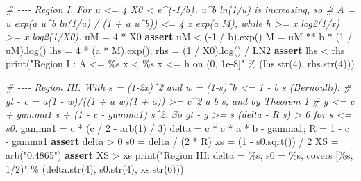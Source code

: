 \documentclass[
  11pt,
]{article}
\newenvironment{Shaded}{}{}
\newcommand{\BuiltInTok}[1]{\textcolor[rgb]{0.00,0.50,0.00}{#1}}
\newcommand{\CommentTok}[1]{\textcolor[rgb]{0.38,0.63,0.69}{\textit{#1}}}
\newcommand{\ControlFlowTok}[1]{\textcolor[rgb]{0.00,0.44,0.13}{\textbf{#1}}}
\newcommand{\DecValTok}[1]{\textcolor[rgb]{0.25,0.63,0.44}{#1}}
\newcommand{\NormalTok}[1]{#1}
\newcommand{\OperatorTok}[1]{\textcolor[rgb]{0.40,0.40,0.40}{#1}}
\newcommand{\SpecialCharTok}[1]{\textcolor[rgb]{0.25,0.44,0.63}{#1}}
\newcommand{\StringTok}[1]{\textcolor[rgb]{0.25,0.44,0.63}{#1}}
\begin{document}
\begin{Shaded}
\begin{Highlighting}[]
\CommentTok{\# {-}{-}{-}{-} Region I. For u \textless{}= 4 X0 \textless{} e\^{}\{{-}1/b\}, u\^{}b ln(1/u) is increasing, so}
\CommentTok{\#      A = u exp(a u\^{}b ln(1/u) / (1 + a u\^{}b)) \textless{}= 4 x exp(a M), while h \textgreater{}= x log2(1/x) \textgreater{}= x log2(1/X0).}
\NormalTok{uM }\OperatorTok{=} \DecValTok{4} \OperatorTok{*}\NormalTok{ X0}
\ControlFlowTok{assert}\NormalTok{ uM }\OperatorTok{\textless{}}\NormalTok{ (}\OperatorTok{{-}}\DecValTok{1} \OperatorTok{/}\NormalTok{ b).exp()}
\NormalTok{M }\OperatorTok{=}\NormalTok{ uM }\OperatorTok{**}\NormalTok{ b }\OperatorTok{*}\NormalTok{ (}\DecValTok{1} \OperatorTok{/}\NormalTok{ uM).log()}
\NormalTok{lhs }\OperatorTok{=} \DecValTok{4} \OperatorTok{*}\NormalTok{ (a }\OperatorTok{*}\NormalTok{ M).exp()}\OperatorTok{;}\NormalTok{ rhs }\OperatorTok{=}\NormalTok{ (}\DecValTok{1} \OperatorTok{/}\NormalTok{ X0).log() }\OperatorTok{/}\NormalTok{ LN2}
\ControlFlowTok{assert}\NormalTok{ lhs }\OperatorTok{\textless{}}\NormalTok{ rhs}
\BuiltInTok{print}\NormalTok{(}\StringTok{"Region I  : A \textless{}= }\SpecialCharTok{\%s}\StringTok{ x \textless{} }\SpecialCharTok{\%s}\StringTok{ x \textless{}= h on (0, 1e{-}8]"} \OperatorTok{\%}\NormalTok{ (lhs.}\BuiltInTok{str}\NormalTok{(}\DecValTok{4}\NormalTok{), rhs.}\BuiltInTok{str}\NormalTok{(}\DecValTok{4}\NormalTok{)))}

\CommentTok{\# {-}{-}{-}{-} Region III. With s = (1{-}2x)\^{}2 and w = (1{-}s)\^{}b \textless{}= 1 {-} b s (Bernoulli):}
\CommentTok{\#      gt {-} c = a(1 {-} w)/((1 + a w)(1 + a)) \textgreater{}= c\^{}2 a b s, and by Theorem 1}
\CommentTok{\#      g \textless{}= c + gamma1 s + (1 {-} c {-} gamma1) s\^{}2. So gt {-} g \textgreater{}= s (delta {-} R s) \textgreater{} 0 for s \textless{}= s0.}
\NormalTok{gamma1 }\OperatorTok{=}\NormalTok{ c }\OperatorTok{*}\NormalTok{ (c }\OperatorTok{/} \DecValTok{2} \OperatorTok{{-}}\NormalTok{ arb(}\DecValTok{1}\NormalTok{) }\OperatorTok{/} \DecValTok{3}\NormalTok{)}
\NormalTok{delta }\OperatorTok{=}\NormalTok{ c }\OperatorTok{*}\NormalTok{ c }\OperatorTok{*}\NormalTok{ a }\OperatorTok{*}\NormalTok{ b }\OperatorTok{{-}}\NormalTok{ gamma1}\OperatorTok{;}\NormalTok{ R }\OperatorTok{=} \DecValTok{1} \OperatorTok{{-}}\NormalTok{ c }\OperatorTok{{-}}\NormalTok{ gamma1}
\ControlFlowTok{assert}\NormalTok{ delta }\OperatorTok{\textgreater{}} \DecValTok{0}
\NormalTok{s0 }\OperatorTok{=}\NormalTok{ delta }\OperatorTok{/}\NormalTok{ (}\DecValTok{2} \OperatorTok{*}\NormalTok{ R)}
\NormalTok{xs }\OperatorTok{=}\NormalTok{ (}\DecValTok{1} \OperatorTok{{-}}\NormalTok{ s0.sqrt()) }\OperatorTok{/} \DecValTok{2}
\NormalTok{XS }\OperatorTok{=}\NormalTok{ arb(}\StringTok{"0.4865"}\NormalTok{)}
\ControlFlowTok{assert}\NormalTok{ XS }\OperatorTok{\textgreater{}}\NormalTok{ xs}
\BuiltInTok{print}\NormalTok{(}\StringTok{"Region III: delta = }\SpecialCharTok{\%s}\StringTok{, s0 = }\SpecialCharTok{\%s}\StringTok{, covers [}\SpecialCharTok{\%s}\StringTok{, 1/2)"} \OperatorTok{\%}\NormalTok{ (delta.}\BuiltInTok{str}\NormalTok{(}\DecValTok{4}\NormalTok{), s0.}\BuiltInTok{str}\NormalTok{(}\DecValTok{4}\NormalTok{), xs.}\BuiltInTok{str}\NormalTok{(}\DecValTok{6}\NormalTok{)))}


\end{Highlighting}
\end{Shaded}
\end{document}
